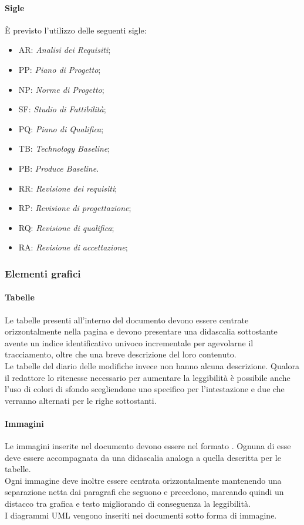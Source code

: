 \paragraph{Sigle} \Spazio
È previsto l’utilizzo delle seguenti sigle:
\begin{itemize}
	\item AR: \textit{Analisi dei Requisiti};
	\item PP: \textit{Piano di Progetto};
	\item NP: \textit{Norme di Progetto};
	\item SF: \textit{Studio di Fattibilità};
	\item PQ: \textit{Piano di Qualifica};
	\item TB: \emph{Technology Baseline};
	\item PB: \emph{Produce Baseline}.
	\item RR: \emph{Revisione dei requisiti};
	\item RP: \emph{Revisione di progettazione};
	\item RQ: \emph{Revisione di qualifica};
	\item RA: \emph{Revisione di accettazione};
\end{itemize}

\subsubsection{Elementi grafici}
\paragraph{Tabelle}\Spazio
Le tabelle presenti all'interno del documento devono essere centrate orizzontalmente nella pagina e devono presentare una didascalia sottostante avente un indice identificativo univoco incrementale per agevolarne il tracciamento, oltre che una breve descrizione del loro contenuto.\\
Le tabelle del diario delle modifiche invece non hanno alcuna descrizione.
Qualora il redattore lo ritenesse necessario per aumentare la leggibilità è possibile anche l'uso di colori di sfondo scegliendone uno specifico per l'intestazione e due che verranno alternati per le righe sottostanti.

\paragraph{Immagini}\Spazio
Le immagini inserite nel documento devono essere nel formato . Ognuna di esse deve essere accompagnata da una didascalia analoga a quella descritta per le tabelle. \\
Ogni immagine deve inoltre essere centrata orizzontalmente mantenendo una separazione netta dai paragrafi che seguono e precedono, marcando quindi un distacco tra grafica e testo migliorando di conseguenza la leggibilità. \\
I diagrammi UML vengono inseriti nei documenti sotto forma di immagine.
